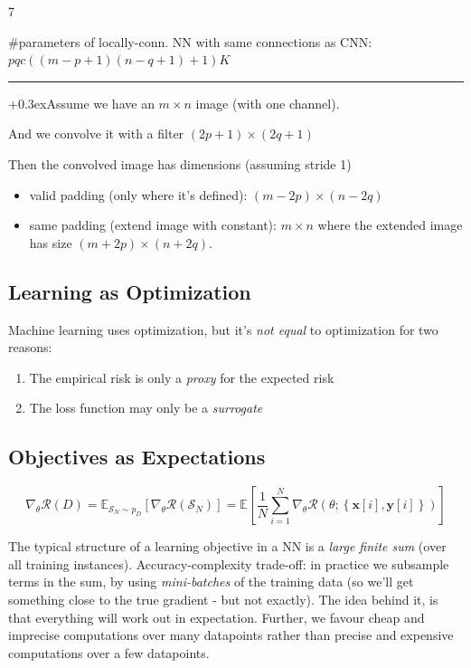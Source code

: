 \documentclass[a2paper,8pt]{extarticle}
\makeatletter
\newcommand{\cR}{\mathcal{R}}
\newcommand{\cS}{\mathcal{S}}
\newcommand{\set}[1]{\left\{ #1 \right\}}
\newcommand{\Exp}[2][]{{\mathbb{E}_{#1}}\left[ #2
\right]}
\renewcommand{\vec}[1]{\mathbf{#1}}
\newcommand{\vx}{\vec{x}}
\newcommand{\vy}{\vec{y}}
\newcommand{\customboxpaddingsize}{0pt}
\newcommand{\emptyarg}[1][]{\ifthenelse{\isempty{#1}}{}{\ (#1)}}
\newcommand{\Ex}[1][]{{\setlength\fboxsep{\customboxpaddingsize}
\colorbox{excolor}{%
\color{custtitlecolor}{\textbf{Ex.\emptyarg[#1]}}}\kern+0.3ex}}
\newcommand*{\mybox}[1]{%
    \noindent\colorbox{sectionbarcolor}{%
        \parbox{\dimexpr\columnwidth-2\fboxsep\relax}{%
            \textcolor{white}{#1}}}}
\newcommand*{\mybox}[1]{%
    \noindent\colorbox{sectioncolor}{%
        \parbox{\dimexpr\columnwidth-2\fboxsep\relax}{%
            \textcolor{white}{#1}}}}
\newcommand{\sectionsizeBefore}{0pt}
\newcommand{\sectionsizeAfter}{0pt}
\newcommand{\sectionsizeFont}{\normalfont}
\newcommand{\sectionsizeBefore}{-8pt}
\newcommand{\sectionsizeAfter}{3pt}
\newcommand{\sectionsizeFont}{\normalfont}
\renewcommand\section{
\@startsection {section}{1}{\z@}{\sectionsizeBefore
}{\sectionsizeAfter
}{\sectionsizeFont\large\bfseries\mybox}}
\newcommand{\sep}{\vspace{0pt}\noindent\hrule\vspace{0pt}}
\newcommand{\ssep}{\hdashrule[1.1ex]{\linewidth}{0.1pt}{0.3mm}\vspace{-6pt}}
\newcommand{\sep}{\vspace{5pt}\noindent\hrule\vspace{5pt}}
\newcommand{\ssep}{\hdashrule[1.1ex]{\linewidth}{0.1pt}{0.3mm}\vspace{-3pt}}
\makeatother
\begin{document}
\begin{landscape}
\begin{multicols*}{7}
\ssep

\#parameters of locally-conn. NN with same connections as CNN:\\
$pqc((m-p+1)(n-q+1)+1)K$

\sep

\Ex Assume we have an $m\times n$ image (with one channel).

And we convolve it with a filter $(2p+1)\times (2q+1)$

Then the convolved image has dimensions (assuming stride 1)
\begin{itemize}
  \item valid padding (only where it's defined): $(m-2p)\times (n-2q)$
  \item same padding (extend image with constant): $m\times n$ where the
  extended image has size $(m+2p)\times (n+2q)$.
\end{itemize}

\section{Optimization}

\subsection{Learning as Optimization}

Machine learning uses optimization, but it's \emph{not equal} to optimization
for two reasons:
\begin{enumerate}
  \item The empirical risk is only a \emph{proxy} for the expected risk
  \item The loss function may only be a \emph{surrogate}
\end{enumerate}

\subsection{Objectives as Expectations}

\[
\nabla_{\theta}\cR(D)
=
\Exp[\cS_N\sim p_D]{\nabla_{\theta}\cR(\cS_N)}
=
\Exp{
\frac{1}{N}
\sum_{i=1}^N
\nabla_{\theta}\cR(\theta;\set{\vx[i],\vy[i]})
}
\]

The typical structure of a learning objective in a NN is a \emph{large finite
sum} (over all training instances). Accuracy-complexity trade-off: in practice
we subsample terms in the sum, by using \emph{mini-batches} of the training data 
(so we'll get something close to the true gradient - but not exactly). The idea
behind it, is that everything will work out in expectation. Further, we favour
cheap and imprecise computations over many datapoints rather than precise and
expensive computations over a few datapoints.


\end{multicols*}
\end{landscape}
\end{document}

